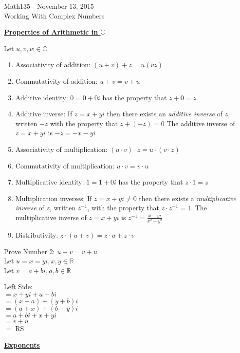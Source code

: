 \documentclass{letter}
\begin{document}
	\begin{center}
		\LARGE Math135 - November 13, 2015\\
		\large Working With Complex Numbers
	\end{center}
	\vspace{0.25 in}
	\underline{\textbf{Properties of Arithmetic in $\mathbb{C}$}}
	
	Let $u, v, w \in \mathbb{C}$
	\begin{enumerate}[1)]
		\item Associativity of addition: $(u + v) + z = u (v z)$
		\item Commutativity of addition: $u + v = v + u$
		\item Additive identity: $0 = 0 + 0i$ has the property that $z + 0 = z$
		\item Additive inverse: If $z = x+yi$ then there exists an \textit{additive inverse} of $z$, written $-z$ with the property that $z + (-z) = 0$ The additive inverse of $z = x+yi$ is $-z = -x - yi$
		\item Associativity of multiplication: $(u \cdot v) \cdot z = u \cdot (v \cdot z)$
		\item Commutativity of multiplication: $u \cdot v = v \cdot u$
		\item Multiplicative identity: $1 = 1 + 0i$ has the property that $z \cdot 1 = z$
		\item Multiplication inverses: If $z = x + yi \neq 0$ then there exists a \textit{multiplicative inverse} of $z$, written $z^{-1}$, with the property  that $z \cdot z^{-1} = 1$. The multiplicative inverse of $z = x + yi$ is $z^{-1} = \frac{x-yi}{x^2 + y^2}$
		\item Distributivity: $z \cdot (u + v) = z \cdot u + z \cdot v$
	\end{enumerate}
	
	Prove Number 2: $u + v = v + u$\\
	
	Let $u = x = yi, x, y \in \mathbb{R}$\\
	Let $v = a + bi, a, b \in \mathbb{R}$
	
	Left Side:\\
	$= x + yi + a + bi$\\
	$= (x+a) + (y+b)i$\\
	$= (a+x) + (b+y)i$\\
	$= a + bi + x + yi$\\
	$= v + u$\\
	$=$ RS
	
	\underline{\textbf{Exponents}}
	
\end{document}
